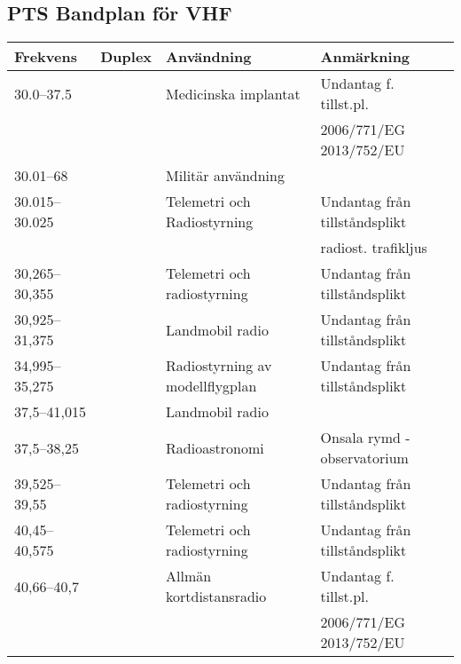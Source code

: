 \begin{landscape}
\small
\subsection{PTS Bandplan för VHF}
\begin{longtable}{llll}
	\textbf{Frekvens}  & \textbf{Duplex}    & \textbf{Användning}                   & \textbf{Anmärkning}            \\ \hline
	\endhead
	30.0--37.5         &                    & Medicinska implantat                  & Undantag f. tillst.pl.         \\
	                   &                    &                                       & 2006/771/EG 2013/752/EU        \\
	30.01--68          &                    & Militär användning                    &                                \\
	30.015--30.025     &                    & Telemetri och Radiostyrning           & Undantag från tillståndsplikt  \\
	                   &                    &                                       & radiost. trafikljus            \\
	30,265--30,355     &                    & Telemetri och radiostyrning           & Undantag från tillståndsplikt  \\
	30,925--31,375     &                    & Landmobil radio                       & Undantag från tillståndsplikt  \\
	34,995--35,275     &                    & Radiostyrning av modellflygplan       & Undantag från tillståndsplikt  \\
	37,5--41,015       &                    & Landmobil radio                       &                                \\
	37,5--38,25        &                    & Radioastronomi                        & Onsala rymd - observatorium    \\
	39,525--39,55      &                    & Telemetri och radiostyrning           & Undantag från tillståndsplikt  \\
	40,45--40,575      &                    & Telemetri och radiostyrning           & Undantag från tillståndsplikt  \\
	40,66--40,7        &                    & Allmän kortdistansradio               & Undantag f. tillst.pl.         \\
	                   &                    &                                       & 2006/771/EG 2013/752/EU        \\

\end{longtable}
\end{landscape}

